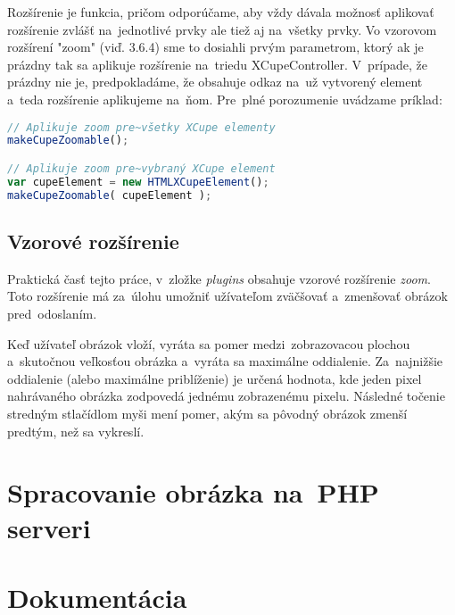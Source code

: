 Rozšírenie je funkcia, pričom odporúčame, aby vždy dávala možnosť aplikovať rozšírenie zvlášť na~jednotlivé prvky ale tiež aj na~všetky prvky. Vo vzorovom rozšírení "zoom" (viď. 3.6.4) sme to dosiahli prvým parametrom, ktorý ak je prázdny tak sa aplikuje rozšírenie na~triedu XCupeController. V~prípade, že prázdny nie je, predpokladáme, že obsahuje odkaz na~už vytvorený element a~teda rozšírenie aplikujeme na~ňom. Pre~plné porozumenie uvádzame príklad:

\begin{lstlisting}[language=JavaScript]
// Aplikuje zoom pre~všetky XCupe elementy
makeCupeZoomable();

// Aplikuje zoom pre~vybraný XCupe element
var cupeElement = new HTMLXCupeElement();
makeCupeZoomable( cupeElement );
\end{lstlisting}

\subsection{Vzorové rozšírenie}

Praktická časť tejto práce, v~zložke \emph{plugins} obsahuje vzorové rozšírenie \emph{zoom}. Toto rozšírenie má za~úlohu umožniť užívateľom zväčšovať a~zmenšovať obrázok pred~odoslaním.

Keď užívateľ obrázok vloží, vyráta sa pomer medzi~zobrazovacou plochou a~skutočnou veľkosťou obrázka a~vyráta sa maximálne oddialenie. Za~najnižšie oddialenie (alebo maximálne priblíženie) je určená hodnota, kde jeden pixel nahrávaného obrázka zodpovedá jednému zobrazenému pixelu. Následné točenie stredným stlačídlom myši mení pomer, akým sa pôvodný obrázok zmenší predtým, než sa vykreslí.

\section{Spracovanie obrázka na~PHP serveri}
\section{Dokumentácia}